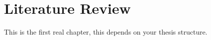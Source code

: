 \chapter{Literature Review}\label{chapter:literature-review}

This is the first real chapter, this depends on your thesis structure. 